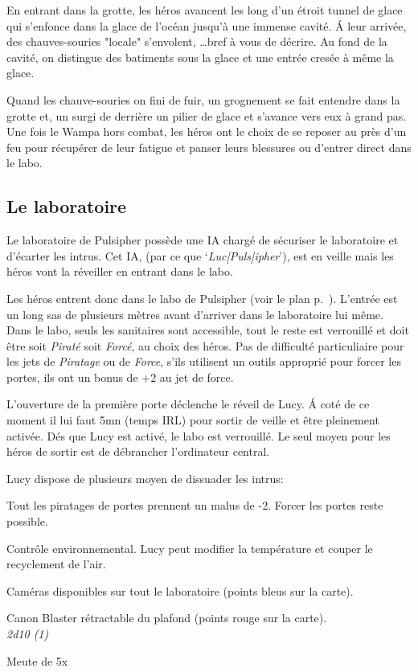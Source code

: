 En entrant dans la grotte, les héros avancent les long d’un étroit tunnel de glace qui s’enfonce dans la glace de l’océan jusqu’à une immense cavité. \'A leur arrivée, des chauves-souries "locale" s’envolent, \ldots bref à vous de décrire. Au fond de la cavité, on distingue des batiments sous la glace et une entrée cresée à même la glace.

Quand les chauve-souries on fini de fuir, un grognement se fait entendre dans la grotte et, un  surgi de derrière un pilier de glace et s’avance vers eux à grand pas.\\

Une fois le Wampa hors combat, les héros ont le choix de se reposer au près d’un feu pour récupérer de leur fatigue et panser leurs blessures ou d’entrer direct dans le labo.

\subsection{Le laboratoire}

Le laboratoire de Pulsipher possède une IA chargé de sécuriser le laboratoire et d’écarter les intrus. Cet IA,  (par ce que ‘\emph{Luc[Puls]ipher}’), est en veille mais les héros vont la réveiller en entrant dans le labo. 

Les héros entrent donc dans le labo de Pulsipher (voir le plan p.~\pageref{sec:plan-labo-pulsipher}). L’entrée est un long sas de plusieurs mètres avant d’arriver dans le laboratoire lui même. Dans le labo, seuls les sanitaires sont accessible, tout le reste est verrouillé et doit être soit \textit{Piraté} soit \textit{Forcé}, au choix des héros. Pas de difficulté particuliaire pour les jets de \textit{Piratage} ou de \textit{Force}, s’ils utilisent un outils approprié pour forcer les portes, ils ont un bonus de +2 au jet de force.

L’ouverture de la première porte déclenche le réveil de Lucy. \'A coté de ce moment il lui faut 5mn (temps IRL) pour sortir de veille et être pleinement activée. Dés que Lucy est activé, le labo est verrouillé. Le seul moyen pour les héros de sortir est de débrancher l’ordinateur central.

Lucy dispose de plusieurs moyen de dissuader les intrus:
\begin{rebelist}
    \item Tout les piratages de portes prennent un malus de -2. Forcer les portes reste possible.
    \item Contrôle environnemental. Lucy peut modifier la température et couper le recyclement de l’air.
    \item Caméras disponibles sur tout le laboratoire (points bleus sur la carte).
    \item Canon Blaster rétractable du plafond (points rouge sur la carte).\\
        \textit{2d10 (1)}
    \item Meute de 5x 
\end{rebelist}

